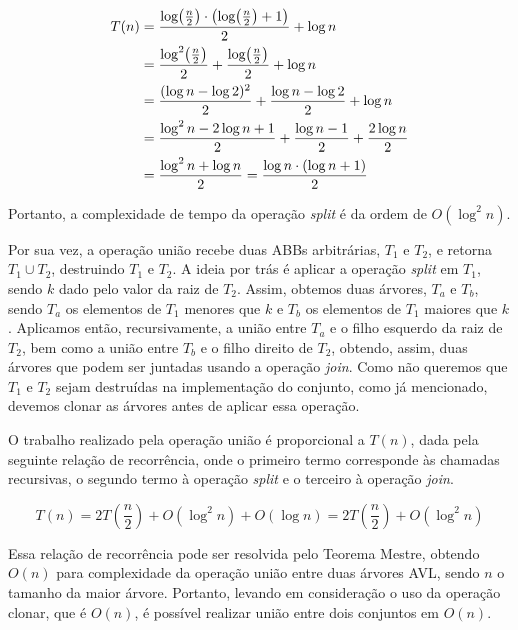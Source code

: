 \documentclass[a4paper,12pt]{report}
\begin{document}
\begin{align*}
 T(n) &= \frac{\log{\hspace{-2pt}\left(\frac{n}{2}\right)} \cdot \left(\log{\hspace{-2pt}\left(\frac{n}{2}\right)} + 1\right)}{2} + \log n \\
	  &= \frac{\log^2\hspace{-2pt}\left(\frac{n}{2}\right)}{2} + \frac{\log{\hspace{-2pt}\left(\frac{n}{2}\right)}}{2} + \log n \\
      &= \frac{(\log n - \log 2)^2}{2} + \frac{\log n - \log 2}{2} + \log n \\
      &= \frac{\log^2 n - 2\log n + 1}{2} + \frac{\log n - 1}{2} + \frac{2\log n}{2} \\
      &= \frac{\log^2 n + \log n}{2}
      = \frac{\log n \cdot \left(\log n + 1\right)}{2}
\end{align*}

Portanto, a complexidade de tempo da operação \textit{split} é da ordem de $O(\log^2 n)$.

Por sua vez, a operação união recebe duas ABBs arbitrárias, $T_1$ e $T_2$, e retorna 
$T_1 \cup T_2$, destruindo $T_1$ e $T_2$. A ideia por trás é aplicar a operação 
\textit{split} em $T_1$, sendo $k$ dado pelo valor da raiz de $T_2$. Assim, obtemos 
duas árvores, $T_a$ e $T_b$, sendo $T_a$ os elementos de $T_1$ menores que $k$ e $T_b$ 
os elementos de $T_1$ maiores que $k$. Aplicamos então, recursivamente, a união entre 
$T_a$ e o filho esquerdo da raiz de $T_2$, bem como a união entre $T_b$ e o filho direito 
de $T_2$, obtendo, assim, duas árvores que podem ser juntadas usando a operação 
\textit{join}. Como não queremos que $T_1$ e $T_2$ sejam destruídas na implementação 
do conjunto, como já mencionado, devemos clonar as árvores antes de aplicar essa operação. 

O trabalho realizado pela operação união é proporcional a $T(n)$, dada pela seguinte 
relação de recorrência, onde o primeiro termo corresponde às chamadas recursivas,
o segundo termo à operação \textit{split} e o terceiro à operação \textit{join}.

\[
            T(n) = 2T\left(\frac{n}{2}\right) + O(\log^2 n) + O(\log n) 
                 = 2T\left(\frac{n}{2}\right) + O(\log^2 n)
\]

Essa relação de recorrência pode ser resolvida pelo Teorema Mestre, obtendo $O(n)$ para
complexidade da operação união entre duas árvores AVL, sendo $n$ o tamanho da maior árvore.
Portanto, levando em consideração o uso da operação clonar, que é $O(n)$, é possível 
realizar união entre dois conjuntos em $O(n)$.
\end{document}

